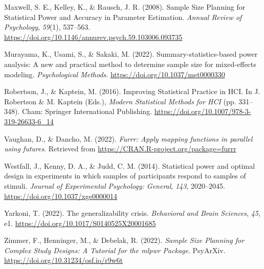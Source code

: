 \documentclass[
  man,floatsintext]{apa6}
\newlength{\cslhangindent}
\newlength{\cslentryspacingunit} %
\newenvironment{CSLReferences}[2] %
 {%
  \setlength{\parindent}{0pt}
  \ifodd #1
  \let\oldpar\par
  \def\par{\hangindent=\cslhangindent\oldpar}
  \fi
  \setlength{\parskip}{#2\cslentryspacingunit}
 }%
 {}
\begin{document}
\begin{CSLReferences}{1}{0}
\leavevmode{}%
Maxwell, S. E., Kelley, K., \& Rausch, J. R. (2008). Sample {Size Planning} for {Statistical Power} and {Accuracy} in {Parameter Estimation}. \emph{Annual Review of Psychology}, \emph{59}(1), 537--563. \url{https://doi.org/10.1146/annurev.psych.59.103006.093735}

\leavevmode{}%
Murayama, K., Usami, S., \& Sakaki, M. (2022). Summary-statistics-based power analysis: {A} new and practical method to determine sample size for mixed-effects modeling. \emph{Psychological Methods}. \url{https://doi.org/10.1037/met0000330}

\leavevmode{}%
Robertson, J., \& Kaptein, M. (2016). Improving {Statistical Practice} in {HCI}. In J. Robertson \& M. Kaptein (Eds.), \emph{Modern {Statistical Methods} for {HCI}} (pp. 331--348). {Cham}: {Springer International Publishing}. \url{https://doi.org/10.1007/978-3-319-26633-6_14}

\leavevmode{}%
Vaughan, D., \& Dancho, M. (2022). \emph{Furrr: Apply mapping functions in parallel using futures}. Retrieved from \url{https://CRAN.R-project.org/package=furrr}

\leavevmode{}%
Westfall, J., Kenny, D. A., \& Judd, C. M. (2014). Statistical power and optimal design in experiments in which samples of participants respond to samples of stimuli. \emph{Journal of Experimental Psychology: General}, \emph{143}, 2020--2045. \url{https://doi.org/10.1037/xge0000014}

\leavevmode{}%
Yarkoni, T. (2022). The generalizability crisis. \emph{Behavioral and Brain Sciences}, \emph{45}, e1. \url{https://doi.org/10.1017/S0140525X20001685}

\leavevmode{}%
Zimmer, F., Henninger, M., \& Debelak, R. (2022). \emph{Sample {Size Planning} for {Complex Study Designs}: {A Tutorial} for the mlpwr {Package}}. {PsyArXiv}. \url{https://doi.org/10.31234/osf.io/r9w6t}

\end{CSLReferences}
\end{document}

